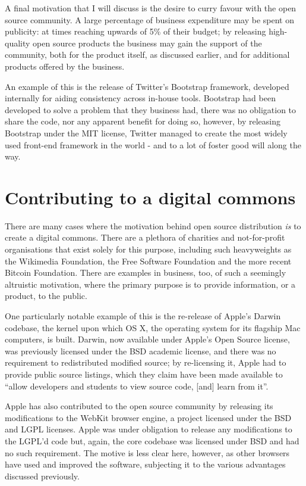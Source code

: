 \documentclass[a4paper]{article}
\begin{document}
A final motivation that I will discuss is the desire to curry favour with the open source community. A large percentage of business expenditure may be spent on publicity: at times reaching upwards of 5\% of their budget\cite{advbudget}; by releasing high-quality open source products the business may gain the support of the community, both for the product itself, as discussed earlier, and for additional products offered by the business.

An example of this is the release of Twitter’s Bootstrap\cite{bootstrap} framework, developed internally for aiding consistency across in-house tools\cite{bootstrappress}. Bootstrap had been developed to solve a problem that they business had, there was no obligation to share the code, nor any apparent benefit for doing so, however, by releasing Bootstrap under the MIT license, Twitter managed to create the most widely used front-end framework in the world\cite{bootstrapblog} - and to a lot of foster good will along the way\cite{bootstrapmoney}.

\section{Contributing to a digital commons}

There are many cases where the motivation behind open source distribution \textit{is} to create a digital commons. There are a plethora of charities and not-for-profit organisations that exist solely for this purpose, including such heavyweights as the Wikimedia Foundation\cite{wikimedia}, the Free Software Foundation\cite{fsf} and the more recent Bitcoin Foundation\cite{bitcoin}. There are examples in business, too, of such a seemingly altruistic motivation, where the primary purpose is to provide information, or a product, to the public.

One particularly notable example of this is the re-release of Apple’s\cite{apple} Darwin codebase, the kernel upon which OS X, the operating system for its flagship Mac computers, is built. Darwin, now available under Apple’s Open Source license\cite{apsl}, was previously licensed under the BSD academic license, and there was no requirement to redistributed modified source; by re-licensing it, Apple had to provide public source listings, which they claim have been made available to “allow developers and students to view source code, [and] learn from it”\cite{appleos}.

Apple has also contributed to the open source community by releasing its modifications to the WebKit browser engine, a project licensed under the BSD and LGPL licenses. Apple was under obligation to release any modifications to the LGPL’d code but, again, the core codebase was licensed under BSD and had no such requirement\cite{appleos}. The motive is less clear here, however, as other browsers\cite{webkitfork} have used and improved the software, subjecting it to the various advantages discussed previously.
\end{document}
